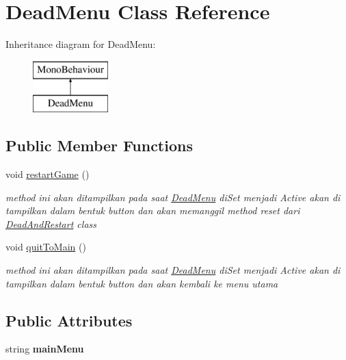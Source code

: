 \hypertarget{class_dead_menu}{}\section{Dead\+Menu Class Reference}
\label{class_dead_menu}
Inheritance diagram for Dead\+Menu\+:\begin{figure}[H]
\begin{center}
\leavevmode
\includegraphics[height=2.000000cm]{class_dead_menu}
\end{center}
\end{figure}
\subsection*{Public Member Functions}
\begin{DoxyCompactItemize}
\item 
void \hyperlink{class_dead_menu_a26ba3bf8f5b33b3f7116f66cbc027757}{restart\+Game} ()
\begin{DoxyCompactList}\small\item\em method ini akan ditampilkan pada saat \hyperlink{class_dead_menu}{Dead\+Menu} di\+Set menjadi Active akan di tampilkan dalam bentuk button dan akan memanggil method reset dari \hyperlink{class_dead_and_restart}{Dead\+And\+Restart} class \end{DoxyCompactList}\item 
void \hyperlink{class_dead_menu_ab1eb66c9f9af09ca199d9878509fd5ba}{quit\+To\+Main} ()
\begin{DoxyCompactList}\small\item\em method ini akan ditampilkan pada saat \hyperlink{class_dead_menu}{Dead\+Menu} di\+Set menjadi Active akan di tampilkan dalam bentuk button dan akan kembali ke menu utama \end{DoxyCompactList}\end{DoxyCompactItemize}
\subsection*{Public Attributes}
\begin{DoxyCompactItemize}
\item 
\hypertarget{class_dead_menu_a264e2731503d6108fc4b88ed3f89791e}{}\label{class_dead_menu_a264e2731503d6108fc4b88ed3f89791e} 
string {\bfseries main\+Menu}
\end{DoxyCompactItemize}



